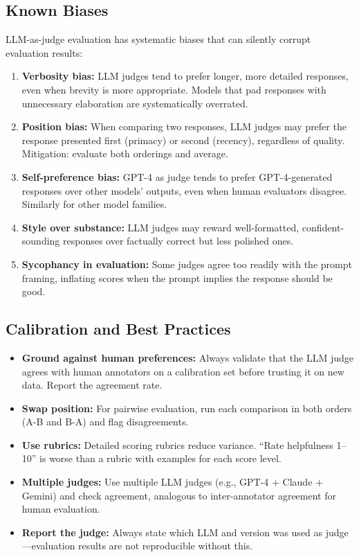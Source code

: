 \subsection{Known Biases}

\begin{warningbox}
LLM-as-judge evaluation has systematic biases that can silently corrupt evaluation
results:
\begin{enumerate}[label=(\arabic*)]
    \item \textbf{Verbosity bias:} LLM judges tend to prefer longer, more detailed
          responses, even when brevity is more appropriate.  Models that pad
          responses with unnecessary elaboration are systematically overrated.
    \item \textbf{Position bias:} When comparing two responses, LLM judges may
          prefer the response presented first (primacy) or second (recency),
          regardless of quality.  Mitigation: evaluate both orderings and average.
    \item \textbf{Self-preference bias:} GPT-4 as judge tends to prefer
          GPT-4-generated responses over other models' outputs, even when human
          evaluators disagree.  Similarly for other model families.
    \item \textbf{Style over substance:} LLM judges may reward well-formatted,
          confident-sounding responses over factually correct but less polished
          ones.
    \item \textbf{Sycophancy in evaluation:} Some judges agree too readily with
          the prompt framing, inflating scores when the prompt implies the
          response should be good.
\end{enumerate}
\end{warningbox}

\subsection{Calibration and Best Practices}

\begin{itemize}
    \item \textbf{Ground against human preferences:} Always validate that the
          LLM judge agrees with human annotators on a calibration set before
          trusting it on new data.  Report the agreement rate.
    \item \textbf{Swap position:} For pairwise evaluation, run each comparison
          in both orders (A-B and B-A) and flag disagreements.
    \item \textbf{Use rubrics:} Detailed scoring rubrics reduce variance.
          ``Rate helpfulness 1--10'' is worse than a rubric with examples for
          each score level.
    \item \textbf{Multiple judges:} Use multiple LLM judges (e.g., GPT-4 +
          Claude + Gemini) and check agreement, analogous to inter-annotator
          agreement for human evaluation.
    \item \textbf{Report the judge:} Always state which LLM and version was used
          as judge---evaluation results are not reproducible without this.
\end{itemize}

